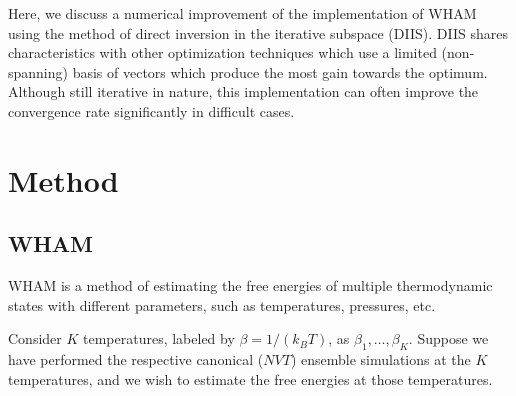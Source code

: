 \documentclass[aip,jcp,preprint,superscriptaddress]{revtex4-1}
\begin{document}
Here, we discuss a numerical improvement of
the implementation of WHAM using
the method of direct inversion in the iterative subspace (DIIS)\cite{
pulay1980, *pulay1982, *hamilton1986,
kovalenko1999, howard2011}.
%
DIIS shares characteristics with other optimization techniques which use a limited (non-spanning) basis of vectors which produce the most gain towards the optimum.
%
Although still iterative in nature,
this implementation
can often improve
the convergence rate
significantly in difficult cases.





\section{Method}





\subsection{WHAM}



WHAM is a method of
estimating the free energies
of multiple thermodynamic states
with different parameters,
such as temperatures, pressures, etc.
%




Consider $K$ temperatures,
labeled by
$\beta = 1/(k_B T)$,
as
$\beta_1, \ldots, \beta_K$.
%
Suppose we have performed the respective
canonical ($NVT$) ensemble simulations
at the $K$ temperatures, and
we wish to estimate the free energies
at those temperatures.
\end{document}
